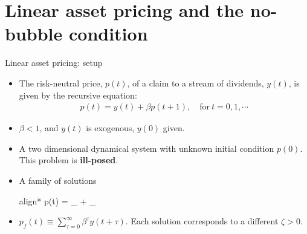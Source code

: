 \documentclass[aspectratio=169,10pt]{beamer}
\newcommand{\emphcolor}[1]{\textbf{\textcolor{emphcolorval}{#1}}}
\begin{document}
\section{\textcolor{PennBlue}{Linear asset pricing and the no-bubble condition}}

\begin{frame}{Linear asset pricing: setup }
	\begin{itemize}
	\item The risk-neutral price, $p(t)$, of a claim to a stream of dividends, $y(t)$, is given by
	the recursive equation:
	\begin{align*}
		p(t) = y(t) + \beta p(t+1), \quad \text{for}~ t=0,1,\cdots
	\end{align*}
	\item $\beta<1$, and $y(t)$ is exogenous, $y(0)$ given.
	\item A two dimensional dynamical system with unknown initial condition  $p(0)$. This problem is \emphcolor{ill-posed}.
	\item A family of solutions
	 \begin{empheq}[box=\tcbhighmath]{align*}
	 	p(t) = _{} +  _{}
	 \end{empheq}
	 \item $p_f(t) \equiv \sum_{\tau =0}^\infty \beta^\tau y(t+\tau)$. Each solution corresponds to a different $\zeta>0$.
	\end{itemize}
\end{frame}
\end{document}
